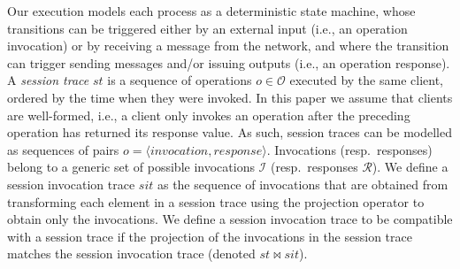 \documentclass[acmlarge, ,11pt]{acmart}
\begin{document}


Our execution models each process as a deterministic state machine, whose transitions can be triggered either by an external input (i.e., an operation invocation) or by receiving a message from the network, and where the transition can trigger sending messages and/or issuing outputs (i.e., an operation response).
A \emph{session trace} $\mathit{st}$ is a sequence of operations $o \in \mathcal{O}$ executed by the same client, ordered by the time when they were invoked. In this paper we assume that clients are well-formed, i.e., a client only invokes an operation after the preceding operation has returned its response value. As such, session traces can be modelled as sequences of pairs $o = \langle \textit{invocation},\textit{response}\rangle$. Invocations (resp.\ responses) belong to a generic set of possible invocations $\mathcal{I}$ (resp.\ responses $\mathcal{R}$).
We define a session invocation trace $\mathit{sit}$ as the sequence of invocations that are obtained from transforming each element in a session trace using the projection operator to obtain only the invocations. We define a session invocation trace to be compatible with a session trace if the projection of the invocations in the session trace matches the session invocation trace (denoted $st\bowtie sit$).

\end{document}
